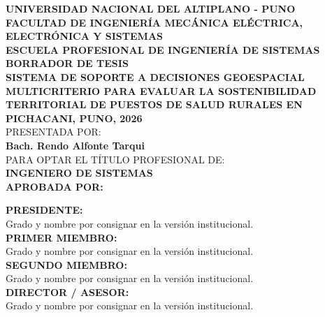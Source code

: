 \documentclass[12pt,a4paper,oneside]{article}
\begin{document}
\thispagestyle{empty}
\begin{center}
    {\bfseries\Large UNIVERSIDAD NACIONAL DEL ALTIPLANO - PUNO}\\[0.3cm]
    {\bfseries\large FACULTAD DE INGENIERÍA MECÁNICA ELÉCTRICA, ELECTRÓNICA Y SISTEMAS}\\[0.2cm]
    {\bfseries\large ESCUELA PROFESIONAL DE INGENIERÍA DE SISTEMAS}\\[1.0cm]
    
    {\bfseries\Large BORRADOR DE TESIS}\\[0.5cm]
    
    {\bfseries\large SISTEMA DE SOPORTE A DECISIONES GEOESPACIAL MULTICRITERIO PARA EVALUAR LA SOSTENIBILIDAD TERRITORIAL DE PUESTOS DE SALUD RURALES EN PICHACANI, PUNO, 2026}\\[0.8cm]
    
    {\small PRESENTADA POR:}\\[0.1cm]
    {\bfseries Bach. Rendo Alfonte Tarqui}\\[0.6cm]
    
    {\small PARA OPTAR EL TÍTULO PROFESIONAL DE:}\\[0.1cm]
    {\bfseries INGENIERO DE SISTEMAS}\\[0.8cm]
    
    {\bfseries APROBADA POR:}\\[1.2cm]
\end{center}

\vspace{0.8cm}
\begin{flushleft}
\noindent\textbf{PRESIDENTE:} \underline{\hspace{9cm}}\\[0.1cm]
\small{Grado y nombre por consignar en la versión institucional.}\\[0.8cm]

\noindent\textbf{PRIMER MIEMBRO:} \underline{\hspace{8.3cm}}\\[0.1cm]
\small{Grado y nombre por consignar en la versión institucional.}\\[0.8cm]

\noindent\textbf{SEGUNDO MIEMBRO:} \underline{\hspace{8.1cm}}\\[0.1cm]
\small{Grado y nombre por consignar en la versión institucional.}\\[0.8cm]

\noindent\textbf{DIRECTOR / ASESOR:} \underline{\hspace{7.8cm}}\\[0.1cm]
\small{Grado y nombre por consignar en la versión institucional.}\\[0.8cm]
\end{flushleft}
\end{document}
